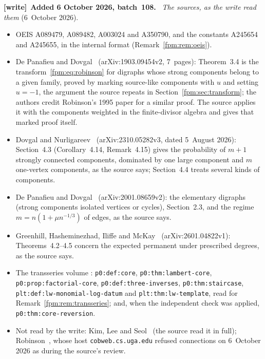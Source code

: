 \documentclass[11pt]{article}
\theoremstyle{definition}\newtheorem{definition}[theorem]{Definition}
\theoremstyle{remark}\newtheorem{remark}[theorem]{Remark}
\newcommand{\file}[1]{\nolinkurl{#1}}
\newenvironment{writenote}[1][]{\par\smallskip\begingroup\small
 \noindent\textbf{[write]}\if\relax\detokenize{#1}\relax\else~\textbf{#1.}\fi\ }%
 {\par\endgroup\smallskip}
\begin{document}
\begin{writenote}[Added 6 October 2026, batch~108]
\emph{The sources, as the write read them} (6~October 2026).
\begin{itemize}\raggedright
\item OEIS A089479, A089482, A003024 and A350790, and the constants
 A245654 and A245655, in the internal format (Remark~\ref{fpm:rem:oeis}).
\item De Panafieu and Dovgal~\cite{symbolic} (arXiv:1903.09454v2, 7~pages):
 Theorem~3.4 is the transform~\eqref{fpm:eq:robinson} for digraphs whose
 strong components belong to a given family, proved by marking source-like
 components with $u$ and setting $u=-1$, the argument the source repeats in
 Section~\ref{fpm:sec:transform}; the authors credit Robinson's 1995 paper
 for a similar proof. The source applies it with the components weighted in
 the finite-divisor algebra and gives that marked proof itself.
\item Dovgal and Nurligareev~\cite{dense} (arXiv:2310.05282v3, dated
 5~August 2026): Section~4.3 (Corollary~4.14, Remark~4.15) gives the
 probability of $m+1$ strongly connected components, dominated by one large
 component and $m$ one-vertex components, as the source says; Section~4.4
 treats several kinds of components.
\item De Panafieu and Dovgal~\cite{elementary} (arXiv:2001.08659v2): the
 elementary digraphs (strong components isolated vertices or cycles),
 Section~2.3, and the regime $m=n(1+\mu n^{-1/3})$ of edges, as the source
 says.
\item Greenhill, Hasheminezhad, Iliffe and McKay~\cite{degrees}
 (arXiv:2601.04822v1): Theorems~4.2--4.5 concern the expected permanent
 under prescribed degrees, as the source says.
\item The transseries volume
 :
 \file{p0:def:core}, \file{p0:thm:lambert-core},
 \file{p0:prop:factorial-core}, \file{p0:def:three-inverses},
 \file{p0:thm:staircase}, \file{plt:def:lw-monomial-log-datum} and
 \file{plt:thm:lw-template}, read for Remark~\ref{fpm:rem:transseries};
 and, when the independent check was applied, \file{p0:thm:core-reversion}.
\item Not read by the write: Kim, Lee and Seol~\cite{prescribed} (the
 source read it in full); Robinson~\cite{robinson}, whose host
 \file{cobweb.cs.uga.edu} refused connections on 6~October 2026 as during
 the source's review.
\end{itemize}


\end{writenote}
\end{document}
